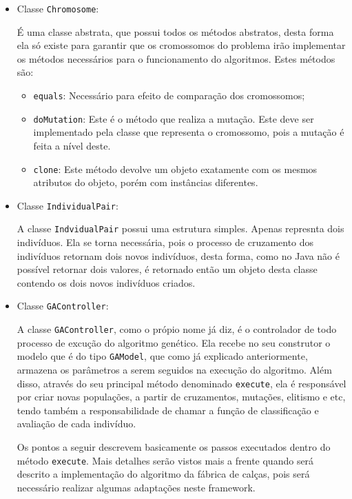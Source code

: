 \begin{itemize}
	\item Classe \texttt{Chromosome}:
	\par É uma classe abstrata, que possui todos os métodos abstratos, desta forma
	ela só existe para garantir que os cromossomos do problema irão implementar os
	métodos necessários para o funcionamento do algoritmos. Estes métodos são:
	
	\begin{itemize}
		
		\item \texttt{equals}: Necessário para efeito de comparação dos cromossomos;
		
		\item \texttt{doMutation}: Este é o método que realiza a mutação. Este deve
		ser implementado pela classe que representa o cromossomo, pois a
		mutação é feita a nível deste.
		
		\item \texttt{clone}: Este método devolve um objeto exatamente com os mesmos
		atributos do objeto, porém com instâncias diferentes.
		
	\end{itemize}
	
	
	\item Classe \texttt{IndividualPair}:
	\par A classe \texttt{IndvidualPair} possui uma estrutura simples. Apenas
	represnta dois indivíduos. Ela se torna necessária, pois o processo de
	cruzamento dos indivíduos retornam dois novos indivíduos, desta forma, como 
	no Java não é possível retornar dois valores, é retornado então um objeto desta
	classe contendo os dois novos indivíduos criados. 
	
	
	\item Classe \texttt{GAController}:
	\par A classe \texttt{GAController}, como o própio nome já diz, é o
	controlador de todo processo de excução do algoritmo genético.
	Ela recebe no seu construtor o modelo que é do tipo \texttt{GAModel}, que como
	já explicado anteriormente, armazena os parâmetros a serem seguidos na
	execução do algoritmo. Além disso, através do seu principal método
	denominado \texttt{execute}, ela é responsável por criar novas populações, a
	partir de cruzamentos, mutações, elitismo e etc, tendo também a
	responsabilidade de chamar a função de classificação e avaliação de cada indivíduo.
	
	\par Os pontos a seguir descrevem basicamente os passos executados dentro do
	método \texttt{execute}. Mais detalhes serão vistos mais a frente quando será
	descrito a implementação do algoritmo da fábrica de calças, pois será necessário 
	realizar algumas adaptações neste framework.
	

\end{itemize}
